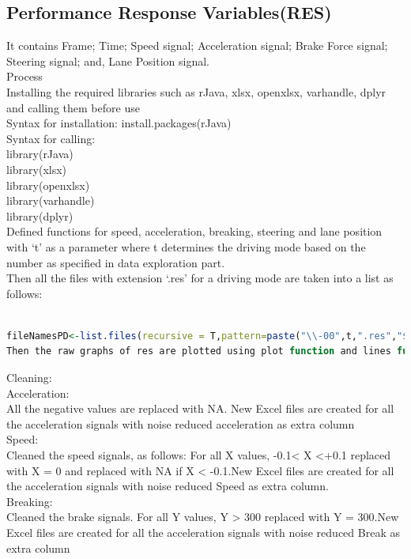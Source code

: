 \documentclass[a4paper]{article}
\begin{document}
\FloatBarrier

\subsection{Performance Response Variables(RES)}

 It contains Frame; Time; Speed signal; Acceleration signal; Brake Force signal; Steering signal; and, Lane Position signal.\\
Process\\
Installing the required libraries such as rJava, xlsx, openxlsx, varhandle, dplyr and calling them before use\\
Syntax for installation: install.packages(rJava)\\
Syntax for calling: \\
library(rJava)\\
library(xlsx)\\
library(openxlsx)\\
library(varhandle)\\
library(dplyr)\\
Defined  functions for speed, acceleration, breaking, steering and lane position with ‘t’ as a parameter where t determines the driving mode based on the number as specified in data exploration part.\\
Then all the files with extension ‘.res’ for a driving mode are taken into a list as follows:
\begin{lstlisting}[language=R]

fileNamesPD<-list.files(recursive = T,pattern=paste("\\-00",t,".res","$",sep = ""))
Then the raw graphs of res are plotted using plot function and lines function with cleaning the data as per the range.

\end{lstlisting}
Cleaning:\\
Acceleration:\\
All the negative values are replaced with NA. New Excel files are created for all the acceleration signals with noise reduced acceleration as extra column\\
Speed:\\
Cleaned the speed signals, as follows: For all X values, -0.1< X <+0.1 replaced with X = 0 and  replaced with NA  if X < -0.1.New Excel files are created for all the acceleration signals with noise reduced Speed as extra column.\\
Breaking:\\
Cleaned the brake signals. For all Y values, Y > 300 replaced with Y = 300.New Excel files are created for all the acceleration signals with noise reduced Break as extra column\\
\end{document}

